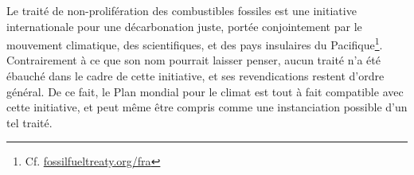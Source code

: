 \documentclass[a5paper,french,openany]{memoir}
\begin{document}
Le traité de non-prolifération des combustibles fossiles est une initiative internationale pour une décarbonation juste, portée conjointement par le mouvement climatique, des scientifiques, et des pays insulaires du Pacifique\footnote{Cf. \href{https://fossilfueltreaty.org/fra}{fossilfueltreaty.org/fra}}. Contrairement à ce que son nom pourrait laisser penser, aucun traité n'a été ébauché dans le cadre de cette initiative, et ses revendications restent d'ordre général. De ce fait, le Plan mondial pour le climat est tout à fait compatible avec cette initiative, et peut même être compris comme une instanciation possible d'un tel traité.






\end{document}
